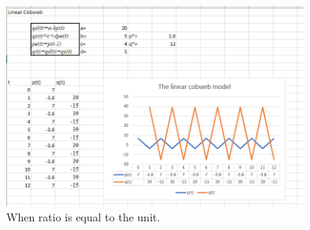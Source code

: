 \documentclass[a4paper,11pt]{report}
\begin{document}
\begin{figure}[h]
\caption{When ratio is equal to the unit.}
\centering
 \includegraphics[width=10cm]{CobwebRatio1.PNG}
\end{figure}
\end{document}
